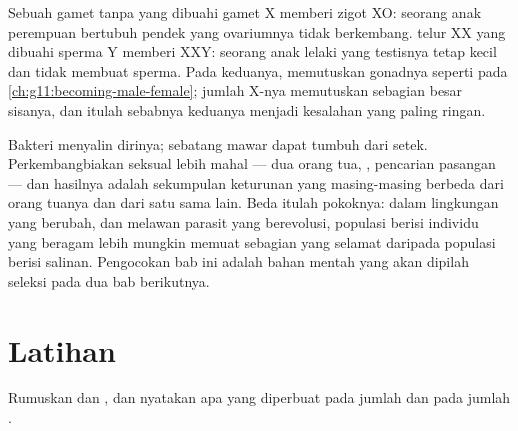 \begin{example}\label{ex:g12:meiosis-genetic-shuffling:sexchrom}
Sebuah gamet tanpa  yang dibuahi gamet  X
memberi zigot XO: seorang anak perempuan bertubuh pendek yang
ovariumnya tidak berkembang.  telur XX yang dibuahi sperma Y memberi
XXY: seorang anak lelaki yang testisnya tetap kecil dan tidak membuat
sperma. Pada keduanya,  memutuskan gonadnya seperti pada
\cref{ch:g11:becoming-male-female}; jumlah  X-nya memutuskan
sebagian besar sisanya, dan itulah sebabnya keduanya menjadi kesalahan
 yang paling ringan.
\end{example}

\begin{remark}\label{rem:g12:meiosis-genetic-shuffling:whysex}
Bakteri menyalin dirinya; sebatang mawar dapat tumbuh dari setek.
Perkembangbiakan seksual lebih mahal --- dua orang tua, ,
pencarian pasangan --- dan hasilnya adalah sekumpulan keturunan yang
masing-masing berbeda dari orang tuanya dan dari satu sama lain. Beda
itulah pokoknya: dalam lingkungan yang berubah, dan melawan parasit
yang berevolusi, populasi berisi individu yang beragam lebih mungkin
memuat sebagian yang selamat daripada populasi berisi salinan.
Pengocokan bab ini adalah bahan mentah yang akan dipilah seleksi pada
dua bab berikutnya.
\end{remark}

\section{Latihan}

\begin{exercise}[$\star$]\label{exo:g12:meiosis-genetic-shuffling:1}
Rumuskan  dan , dan nyatakan apa yang diperbuat 
pada jumlah  dan pada jumlah .
\end{exercise}

